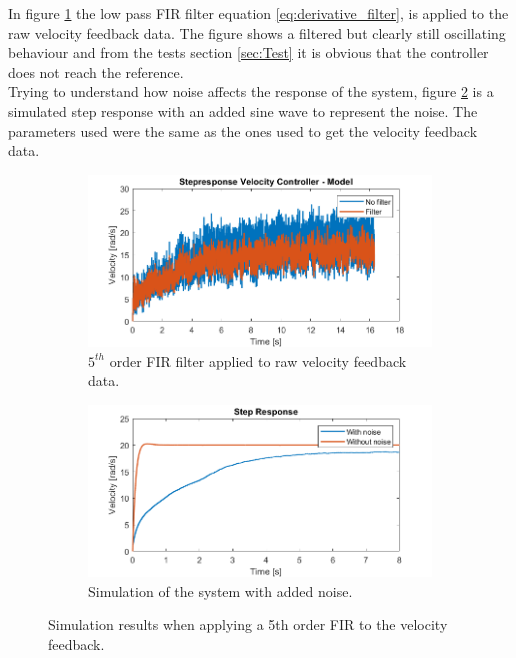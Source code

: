 \documentclass[../../main.tex]{subfiles}
\begin{document}
In figure \ref{fig:FilteredStepRespons5Order} the low pass FIR filter equation \ref{eq:derivative_filter}, is applied to the raw velocity feedback data. The figure shows a filtered but clearly still oscillating behaviour and from the tests section \ref{sec:Test} it is obvious that the controller does not reach the reference.\\

Trying to understand how noise affects the response of the system, figure  \ref{fig:StepResponsAddedNoise} is a simulated step response with an added sine wave to represent the noise. The parameters used were the same as the ones used to get the velocity feedback data. 

\begin{figure}[H]
     \centering
     \begin{subfigure}[b]{0.49\textwidth}
         \centering
    \includegraphics[width=\textwidth]{Sections/Miscellaneous/Images/FilteredStepRespons5Order.png}
    \caption{$5^{th}$ order FIR filter applied to raw velocity feedback data.}
    \label{fig:FilteredStepRespons5Order}
     \end{subfigure}
     \hfill
     \begin{subfigure}[b]{0.49\textwidth}
         \centering
         \includegraphics[width=\textwidth]{Sections/Miscellaneous/Images/StepresponsAddedNoise.png}
         \caption{Simulation of the system with added noise.}
         \label{fig:StepResponsAddedNoise}
     \end{subfigure}
        \caption{Simulation results when applying a 5th order FIR to the velocity feedback.}
        \label{fig:FilterDiskussionImplementedFilter}
\end{figure}
\end{document}
